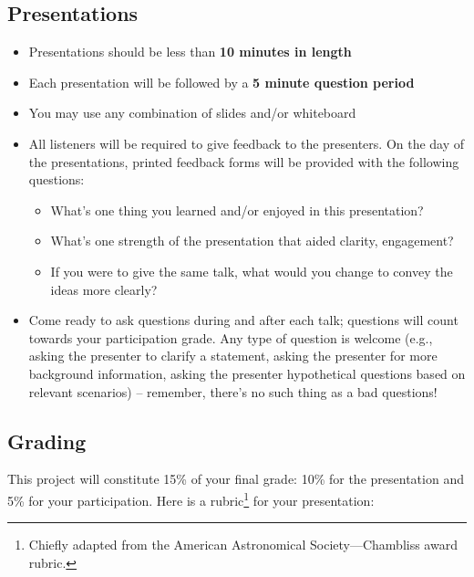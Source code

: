 \documentclass[11pt]{article}
\begin{document}
\subsection*{Presentations}
\begin{itemize}
    \item Presentations should be less than \textbf{10 minutes in length}
    \item Each presentation will be followed by a \textbf{5 minute question period}
    \item You may use any combination of slides and/or whiteboard
    \item All listeners will be required to give feedback to the presenters. On the day of the presentations, printed feedback forms will be provided with the following questions:
    \begin{itemize}
        \item What's one thing you learned and/or enjoyed in this presentation?
        \item What's one strength of the presentation that aided clarity, engagement?
        \item If you were to give the same talk, what would you change to convey
            the ideas more clearly?
    \end{itemize}
    \item Come ready to ask questions during and after each talk; questions will count towards your participation grade. Any type of question is welcome (e.g., asking the presenter to clarify a statement, asking the presenter for more background information, asking the presenter hypothetical questions based on relevant scenarios) -- remember, there's no such thing as a bad questions! 
\end{itemize}

\subsection*{Grading}
This project will constitute 15\% of your final grade: 10\% for the presentation and 5\% for your participation. Here is a rubric\footnote{Chiefly adapted from the American Astronomical Society---Chambliss award rubric.} for your presentation:
\end{document}
